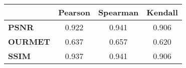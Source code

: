 \begin{tabular}{|l|c|c|c|}
\hline
&\textbf{Pearson}&\textbf{Spearman}&\textbf{Kendall}\\\hline
\textbf{PSNR}&0.922&0.941&0.906\\\hline
\textbf{OURMET}&0.637&0.657&0.620\\\hline
\textbf{SSIM}&0.937&0.941&0.906\\\hline
\end{tabular}
